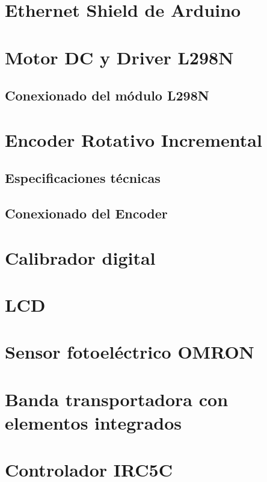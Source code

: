 \section{Ethernet Shield de Arduino}



\section{Motor DC y Driver L298N}

\subsection{Conexionado del módulo L298N}

\section{Encoder Rotativo Incremental}

\subsection{Especificaciones técnicas}

\subsection{Conexionado del Encoder}

\section{Calibrador digital}

\section{LCD}

\section{Sensor fotoeléctrico OMRON}

\section{Banda transportadora con elementos integrados}

\section{Controlador IRC5C}